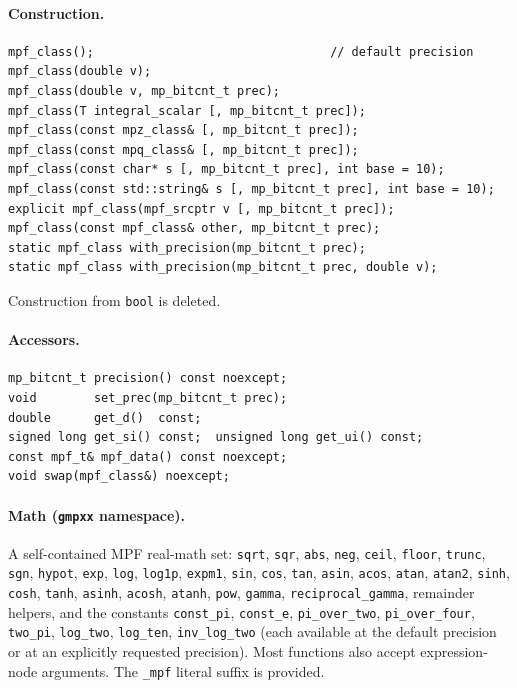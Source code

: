 \documentclass[11pt,a4paper]{article}
\newcommand{\code}[1]{\lstinline!#1!}
\begin{document}
\paragraph{Construction.}
\begin{lstlisting}
mpf_class();                                 // default precision
mpf_class(double v);
mpf_class(double v, mp_bitcnt_t prec);
mpf_class(T integral_scalar [, mp_bitcnt_t prec]);
mpf_class(const mpz_class& [, mp_bitcnt_t prec]);
mpf_class(const mpq_class& [, mp_bitcnt_t prec]);
mpf_class(const char* s [, mp_bitcnt_t prec], int base = 10);
mpf_class(const std::string& s [, mp_bitcnt_t prec], int base = 10);
explicit mpf_class(mpf_srcptr v [, mp_bitcnt_t prec]);
mpf_class(const mpf_class& other, mp_bitcnt_t prec);
static mpf_class with_precision(mp_bitcnt_t prec);
static mpf_class with_precision(mp_bitcnt_t prec, double v);
\end{lstlisting}
Construction from \code{bool} is deleted.

\paragraph{Accessors.}
\begin{lstlisting}
mp_bitcnt_t precision() const noexcept;
void        set_prec(mp_bitcnt_t prec);
double      get_d()  const;
signed long get_si() const;  unsigned long get_ui() const;
const mpf_t& mpf_data() const noexcept;
void swap(mpf_class&) noexcept;
\end{lstlisting}

\paragraph{Math (\code{gmpxx} namespace).}
A self-contained MPF real-math set: \code{sqrt}, \code{sqr}, \code{abs},
\code{neg}, \code{ceil}, \code{floor}, \code{trunc}, \code{sgn}, \code{hypot},
\code{exp}, \code{log}, \code{log1p}, \code{expm1}, \code{sin}, \code{cos},
\code{tan}, \code{asin}, \code{acos}, \code{atan}, \code{atan2}, \code{sinh},
\code{cosh}, \code{tanh}, \code{asinh}, \code{acosh}, \code{atanh}, \code{pow},
\code{gamma}, \code{reciprocal_gamma}, remainder helpers, and the constants
\code{const_pi}, \code{const_e}, \code{pi_over_two}, \code{pi_over_four},
\code{two_pi}, \code{log_two}, \code{log_ten}, \code{inv_log_two} (each available
at the default precision or at an explicitly requested precision). Most functions
also accept expression-node arguments. The \code{_mpf} literal suffix is
provided.
\end{document}

